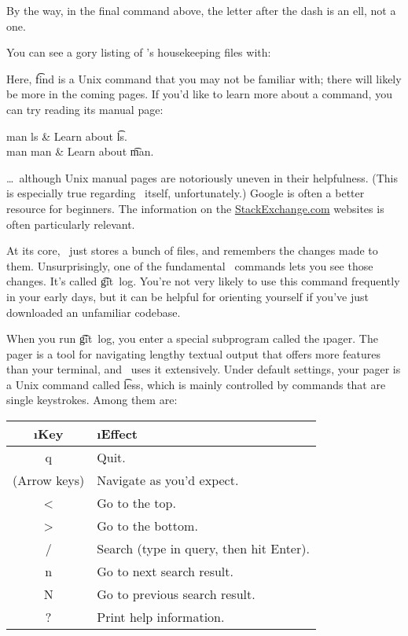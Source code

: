 \documentclass[letterpaper,12pt,titlepage]{article}
\begin{document}
By the way, in the final command above, the letter after the dash is an ell,
not a one.


You can see a gory listing of \git's housekeeping files with:


Here, \t{find} is a Unix command that you may not be familiar with; there will
likely be more in the coming pages. If you'd like to learn more about a
command, you can try reading its manual page:

\begin{typeme}
man ls & Learn about \t{ls}. \\
man man & Learn about \t{man}.
\end{typeme}

\ldots\ although Unix manual pages are notoriously uneven in their
helpfulness. (This is especially true regarding \git\ itself, unfortunately.)
Google is often a better resource for beginners. The information on the
\href{http://stackexchange.com/}{StackExchange.com} websites is often
particularly relevant.



At its core, \git\ just stores a bunch of files, and remembers the changes
made to them. Unsurprisingly, one of the fundamental \git\ commands lets you
see those changes. It's called \t{git~log}. You're not very likely to use this
command frequently in your early days, but it can be helpful for orienting
yourself if you've just downloaded an unfamiliar codebase.


When you run \t{git~log}, you enter a special subprogram called the \i{pager}.
The pager is a tool for navigating lengthy textual output that offers more
features than your terminal, and \git\ uses it extensively. Under default
settings, your pager is a Unix command called \t{less}, which is mainly
controlled by commands that are single keystrokes. Among them are:

\begin{center}
\begin{tabular}{>{\ttfamily}cl}
\rmfamily\i{Key} & \i{Effect} \\ \hline
q & Quit. \\
\rmfamily(Arrow keys) & Navigate as you'd expect. \\
< & Go to the top. \\
> & Go to the bottom. \\
/ & Search (type in query, then hit Enter). \\
n & Go to next search result. \\
N & Go to previous search result. \\
? & Print help information.
\end{tabular}
\end{center}
\end{document}
